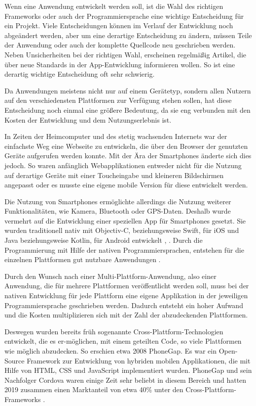 Wenn eine Anwendung entwickelt werden soll, ist die Wahl des richtigen Frameworks oder auch der Programmiersprache eine wichtige Entscheidung für ein Projekt. Viele Entscheidungen können im Verlauf der Entwicklung noch abgeändert werden, aber um eine derartige Entscheidung zu ändern, müssen Teile der Anwendung oder auch der komplette Quellcode neu geschrieben werden. Neben Unsicherheiten bei der richtigen Wahl, erscheinen regelmäßig Artikel, die über neue Standards in der App-Entwicklung informieren wollen. So ist eine derartig wichtige Entscheidung oft sehr schwierig.

Da Anwendungen meistens nicht nur auf einem Gerätetyp, sondern allen Nutzern auf den verschiedensten Plattformen zur Verfügung stehen sollen, hat diese Entscheidung noch einmal eine größere Bedeutung, da sie eng verbunden mit den Kosten der Entwicklung und dem Nutzungserlebnis ist.

In Zeiten der Heimcomputer und des stetig wachsenden Internets war der einfachste Weg eine Webseite zu entwickeln, die über den Browser der genutzten Geräte aufgerufen werden konnte. Mit der Ära der Smartphones änderte sich dies jedoch. So waren anfänglich Webapplikationen entweder nicht für die Nutzung auf derartige Geräte mit einer Toucheingabe und kleineren Bildschirmen angepasst oder es musste eine eigene mobile Version für diese entwickelt werden\cite{Bryant2012}.

Die Nutzung von Smartphones ermöglichte allerdings die Nutzung weiterer Funktionalitäten, wie Kamera, Bluetooth oder GPS-Daten. Deshalb wurde vermehrt auf die Entwicklung einer speziellen App für Smartphones gesetzt. Sie wurden traditionell nativ mit Objectiv-C, beziehungsweise Swift, für iOS und Java beziehungsweise Kotlin, für Android entwickelt \cite{ELKASSAS2017163}, \cite{researchgate_thomas}. Durch die Programmierung mit Hilfe der nativen Programmiersprachen, entstehen für die einzelnen Plattformen gut nutzbare Anwendungen \cite{researchgate_thomas}.

Durch den Wunsch nach einer Multi-Plattform-Anwendung, also einer Anwendung, die für mehrere Plattformen veröffentlicht werden soll, muss bei der nativen Entwicklung für jede Plattform eine eigene Applikation in der jeweiligen Programmiersprache geschrieben werden. Dadurch entsteht ein hoher Aufwand und die Kosten multiplizieren sich mit der Zahl der abzudeckenden Plattformen.

Deswegen wurden bereits früh sogenannte Cross-Plattform-Technologien entwickelt, die es er-möglichen, mit einem geteilten Code, so viele Plattformen wie möglich abzudecken. So erschien etwa 2008 PhoneGap. Es war ein Open-Source Framework zur Entwicklung von hybriden mobilen Applikationen, die mit Hilfe von HTML, CSS und JavaScript implementiert wurden. PhoneGap und sein Nachfolger Cordova waren einige Zeit sehr beliebt in diesem Bereich und hatten 2019 zusammen einen Marktanteil von etwa 40\% unter den Cross-Plattform-Frameworks \cite{statist_CP_Framework}.

